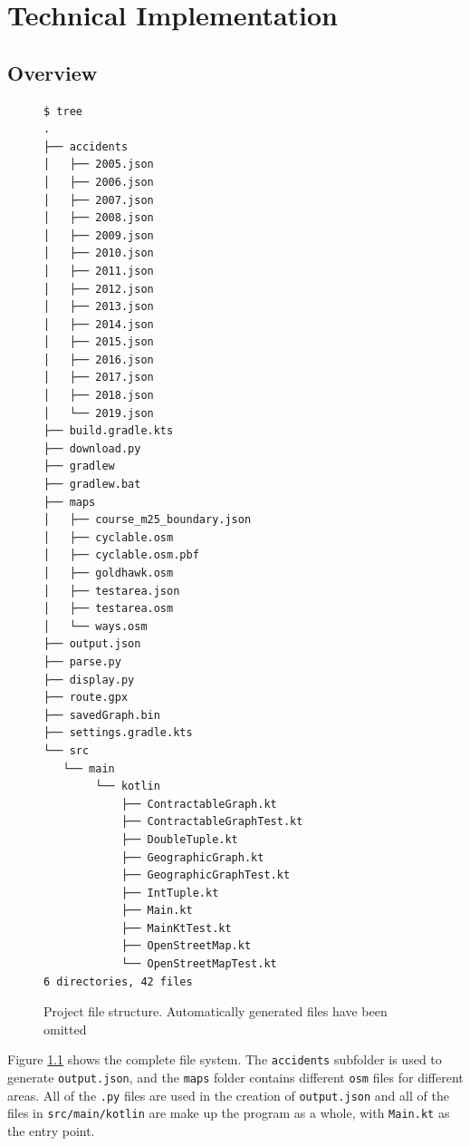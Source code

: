 \documentclass[11pt,twoside,a4paper]{report}
\begin{document}
\chapter{Technical Implementation}
\section{Overview}
\begin{figure}[p]
\begin{verbatim}
$ tree
.
├── accidents
│   ├── 2005.json
│   ├── 2006.json
│   ├── 2007.json
│   ├── 2008.json
│   ├── 2009.json
│   ├── 2010.json
│   ├── 2011.json
│   ├── 2012.json
│   ├── 2013.json
│   ├── 2014.json
│   ├── 2015.json
│   ├── 2016.json
│   ├── 2017.json
│   ├── 2018.json
│   └── 2019.json
├── build.gradle.kts
├── download.py
├── gradlew
├── gradlew.bat
├── maps
│   ├── course_m25_boundary.json
│   ├── cyclable.osm
│   ├── cyclable.osm.pbf
│   ├── goldhawk.osm
│   ├── testarea.json
│   ├── testarea.osm
│   └── ways.osm
├── output.json
├── parse.py
├── display.py
├── route.gpx
├── savedGraph.bin
├── settings.gradle.kts
└── src
   └── main
        └── kotlin
            ├── ContractableGraph.kt
            ├── ContractableGraphTest.kt
            ├── DoubleTuple.kt
            ├── GeographicGraph.kt
            ├── GeographicGraphTest.kt
            ├── IntTuple.kt
            ├── Main.kt
            ├── MainKtTest.kt
            ├── OpenStreetMap.kt
            └── OpenStreetMapTest.kt
6 directories, 42 files
\end{verbatim}
\caption{Project file structure. Automatically generated files have been omitted}
\label{fsystem}
\end{figure}
Figure \ref{fsystem} shows the complete file system. The \texttt{accidents} subfolder is used to generate \texttt{output.json}, and the \texttt{maps} folder contains different \texttt{osm} files for 
different areas. All of the \texttt{.py} files are used in the creation of \texttt{output.json} and all of the files in \texttt{src/main/kotlin} are make up the program as a whole, with \texttt{Main.kt} as the entry point.
\end{document}
